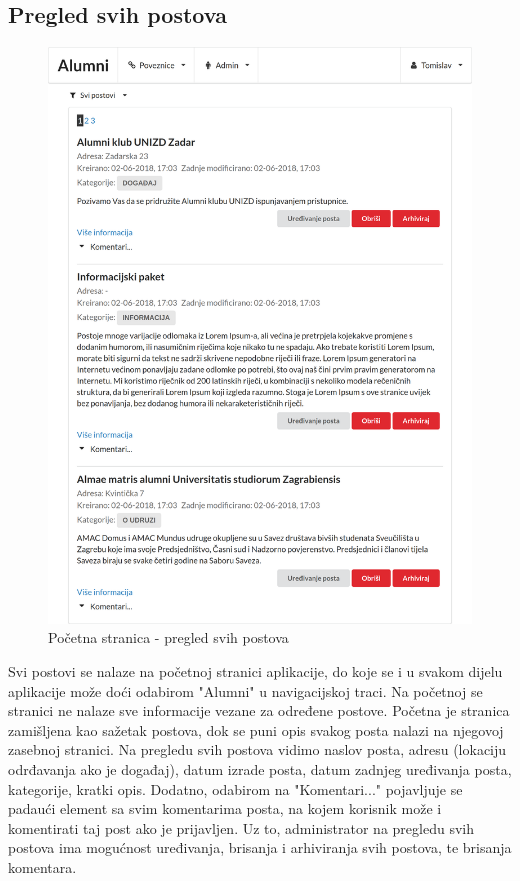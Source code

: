 \documentclass[zavrsni, numeric]{fer}
\begin{document}
\subsection{Pregled svih postova}

\begin{figure}[H]
	\centering
	\includegraphics[width=13cm]{slike/postovi.png}
	\caption{Početna stranica - pregled svih postova}
	\label{fig:postovi}
\end{figure}

Svi postovi se nalaze na početnoj stranici aplikacije, do koje se i u svakom dijelu aplikacije može doći odabirom "Alumni" u navigacijskoj traci. Na početnoj se stranici ne nalaze sve informacije vezane za određene postove. Početna je stranica zamišljena kao sažetak postova, dok se puni opis svakog posta nalazi na njegovoj zasebnoj stranici. Na pregledu svih postova vidimo naslov posta, adresu (lokaciju odrđavanja ako je događaj), datum izrade posta, datum zadnjeg uređivanja posta, kategorije, kratki opis. Dodatno, odabirom na "Komentari..." pojavljuje se padaući element sa svim komentarima posta, na kojem korisnik može i komentirati taj post ako je prijavljen. Uz to, administrator na pregledu svih postova ima mogućnost uređivanja, brisanja i arhiviranja svih postova, te brisanja komentara.
\end{document}
